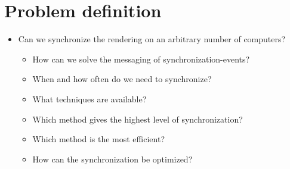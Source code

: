 \section{Problem definition}
\label{sec:problem_definition}

\begin{itemize}
  \item Can we synchronize the rendering on an arbitrary number of computers?
  \begin{itemize}
    \item How can we solve the messaging of synchronization-events?
  	\item When and how often do we need to synchronize?
    \item What techniques are available?
    \item Which method gives the highest level of synchronization? %
    \item Which method is the most efficient?
  	\item How can the synchronization be optimized?
  \end{itemize}
\end{itemize}
